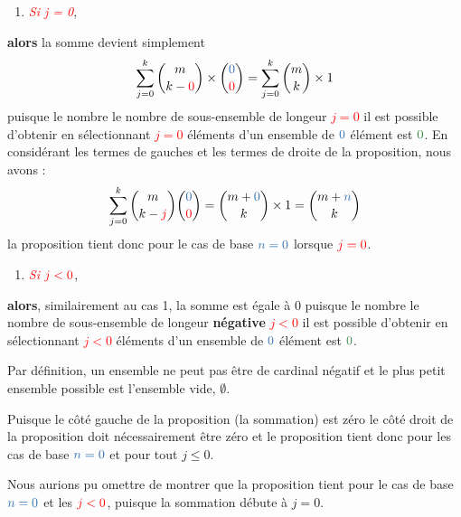 \documentclass[16pt]{report}
\begin{document}
\begin{multicols*}{2}
\begin{Preuve*}{}{}
        \begin{enumerate}
            \item[2.] \textit{\textcolor{red}{Si j = 0}},               
        \end{enumerate}
        \textbf{alors} la somme devient simplement   
        \[ \sum_{j=0}^{k} {m \choose k - \textcolor{red}{0}} \times 
            {\textcolor{myb}{0} \choose \textcolor{red}{0}} = 
        \sum_{j=0}^{k} {m \choose k} \times 1 \]
        puisque le nombre \textcolor{myg}{le nombre de sous-ensemble} de longeur \textcolor{red}{$j = 0$}
        il est possible d'obtenir en sélectionnant \textcolor{red}{$j = 0$} éléments 
        d'un ensemble de $\textcolor{myb}{0}$  élément est $\textcolor{myg}{0}$. En considérant 
        les termes de gauches et les termes de droite de la proposition, 
        nous avons : 
        \[ \sum_{j=0}^{k} {m \choose k - \textcolor{red}{j}}{\textcolor{myb}{0} \choose \textcolor{red}{0}} 
            =  {m + \textcolor{myb}{0} \choose k} \times 1  
        = {m + \textcolor{myb}{n} \choose k} \]
        la proposition tient donc pour le cas de base $\textcolor{myb}{n = 0}$ lorsque $\textcolor{red}{j = 0}$.
        \begin{enumerate}
            \item[3.] \textit{\textcolor{red}{Si}} $\textcolor{red}{j < 0}$,
        \end{enumerate}
        \textbf{alors}, similairement au cas 1, la somme est égale à $0$
        puisque le nombre \textcolor{myg}{le nombre de sous-ensemble} de longeur \textbf{négative}   
        \textcolor{red}{$j < 0$}
        il est possible d'obtenir en sélectionnant \textcolor{red}{$j < 0$} éléments 
        d'un ensemble de $\textcolor{myb}{0}$  élément est $\textcolor{myg}{0}$. 
        \begin{note}{}{}
        Par définition, un 
        ensemble ne peut pas être de cardinal négatif et le plus petit ensemble possible 
        est l'ensemble vide, $\emptyset$. 
        \end{note}  
        Puisque le côté gauche de la proposition (la sommation) est zéro le côté droit 
        de la proposition doit nécessairement être zéro et le proposition tient donc pour les cas 
        de base $\textcolor{myb}{n = 0}$ et pour tout $j \leq 0$.
        \begin{note}{}{}
            Nous aurions pu omettre de montrer que la proposition tient pour le cas de base 
            $\textcolor{myb}{n = 0}$ et les $\textcolor{red}{j < 0}$, puisque la sommation 
            débute à $j = 0$. 
        \end{note}
       

\end{Preuve*}
\end{multicols*}
\end{document}
